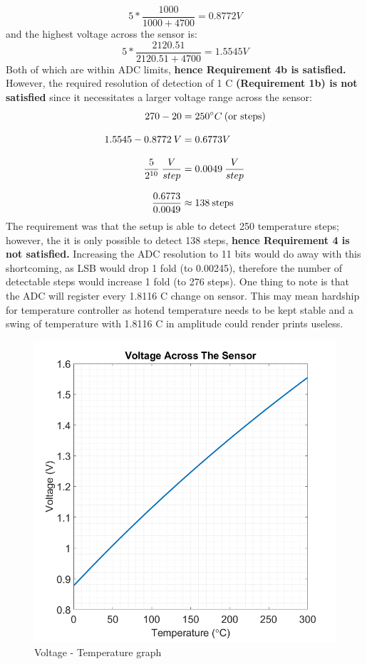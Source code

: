 \begin{equation}
    5*\frac{1000}{1000+4700}= 0.8772 V
\end{equation}
and the highest voltage across the sensor is:
\begin{equation}
    5*\frac{2120.51}{2120.51+4700}= 1.5545 V
\end{equation}
Both of which are within ADC limits, \textbf{hence Requirement 4b is satisfied.} However, the required resolution of detection of 1 \degree C \textbf{(Requirement 1b) is not satisfied} since it necessitates a larger voltage range across the sensor:
\begin{align}
    270 - 20 &= 250 \degree C \: \text{(or steps)}\\[3mm]
    1.5545 - 0.8772 \: V &= 0.6773 V\\[3mm]
    \frac{5}{2^{10}} \: \frac{V}{step} &= 0.0049 \: \frac{V}{step}\\[3mm]
    \frac{0.6773}{0.0049} &\approx 138 \: \text{steps}
\end{align}
The requirement was that the setup is able to detect 250 temperature steps; however, the it is only possible to detect 138 steps, \textbf{hence Requirement 4 is not satisfied.} Increasing the ADC resolution to 11 bits would do away with this shortcoming, as LSB would drop 1 fold (to 0.00245), therefore the number of detectable steps would increase 1 fold (to 276 steps). One thing to note is that the ADC will register every 1.8116 \degree C change on sensor. This may mean hardship for temperature controller as hotend temperature needs to be kept stable and a swing of temperature with 1.8116 \degree C in amplitude could render prints useless.
\begin{figure}[H]
    \centering
    \includegraphics[scale=0.4]{../pics/ptc_temp_volt}
    \caption{Voltage - Temperature graph}
\end{figure}
